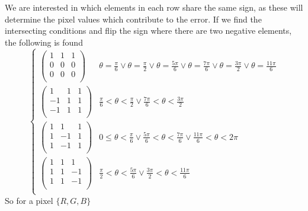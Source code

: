 We are interested in which elements in each row share the same sign, as these will determine the pixel values which contribute to the error. If we find the intersecting conditions and flip the sign where there are two negative elements, the following is found
\begin{equation}
\begin{cases}
 \left(
\begin{array}{ccc}
 1 & 1 & 1 \\
 0 & 0 & 0 \\
 0 & 0 & 0 \\
\end{array}
\right) & \theta =\frac{\pi }{6}\lor \theta =\frac{\pi }{2}\lor \theta =\frac{5 \pi }{6}\lor \theta =\frac{7 \pi }{6}\lor \theta =\frac{3 \pi }{2}\lor \theta =\frac{11 \pi }{6} \\
 \left(
\begin{array}{ccc}
 1 & 1 & 1 \\
 -1 & 1 & 1 \\
 -1 & 1 & 1 \\
\end{array}
\right) & \frac{\pi }{6}<\theta <\frac{\pi }{2}\lor \frac{7 \pi }{6}<\theta <\frac{3 \pi }{2} \\
 \left(
\begin{array}{ccc}
 1 & 1 & 1 \\
 1 & -1 & 1 \\
 1 & -1 & 1 \\
\end{array}
\right) & 0\leq \theta <\frac{\pi }{6}\lor \frac{5 \pi }{6}<\theta <\frac{7 \pi }{6}\lor \frac{11 \pi }{6}<\theta <2 \pi  \\
 \left(
\begin{array}{ccc}
 1 & 1 & 1 \\
 1 & 1 & -1 \\
 1 & 1 & -1 \\
\end{array}
\right) & \frac{\pi }{2}<\theta <\frac{5 \pi }{6}\lor \frac{3 \pi }{2}<\theta <\frac{11 \pi }{6} \\
\end{cases}
\end{equation}
So for a pixel $\{R,G,B\}$  %
